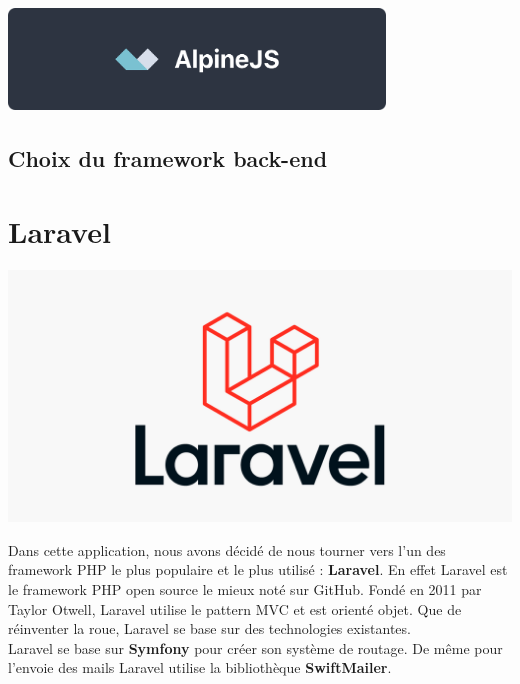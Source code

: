 			\begin{center}
				\includegraphics[width=10cm]{chap_2/alpine.png}
				\label{figure8}
				\cite{logo_alpine}
			\end{center}
				
		\subsection{Choix du framework back-end}
			\section*{Laravel}
				\begin{center}
					\includegraphics[scale=0.2]{chap_2/laravel.png}
					\label{logo de laravel}
					\cite{logo_laravel}
				\end{center}
			Dans cette application, nous avons décidé de nous tourner vers l'un des framework PHP le plus populaire et le plus utilisé : \textbf{Laravel}.\newline
			En effet Laravel est le framework PHP open source le mieux noté sur GitHub. Fondé en 2011 par Taylor Otwell, Laravel utilise le pattern MVC et est orienté objet.\cite{laravel_1}\newline
			Que de réinventer la roue, Laravel se base sur des technologies existantes.\\
			Laravel se base sur \textbf{Symfony} pour créer son système de routage. De même pour l'envoie des mails Laravel utilise la bibliothèque \textbf{SwiftMailer}.
